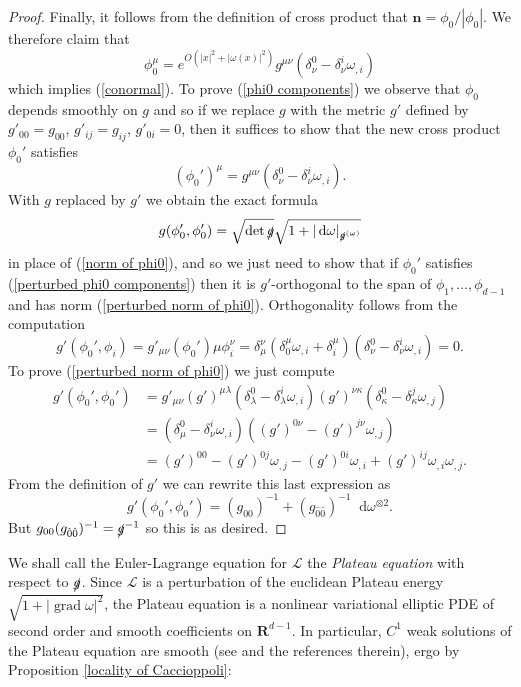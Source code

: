 \documentclass[reqno,12pt,letterpaper]{amsart}
\newcommand{\RR}{\mathbf{R}}
\newcommand*\dif{\mathop{}\!\mathrm{d}}
\DeclareMathOperator{\grad}{grad}
\newcommand{\Lagrange}{\mathscr L}
\newcommand{\normal}{\mathbf n}
\newcommand{\dfn}[1]{\emph{#1}\index{#1}}
\theoremstyle{definition}
\numberwithin{equation}{section}
\begin{document}
\begin{proof}
Finally, it follows from the definition of cross product that $\normal = \phi_0/|\phi_0|$.
We therefore claim that
\begin{equation}\label{phi0 components}
\phi_0^\mu = e^{O(|x|^2 + |\omega(x)|^2)} g^{\mu\nu}(\delta_\nu^0 - \delta_\nu^i\omega_{,i})
\end{equation}
which implies (\ref{conormal}). To prove (\ref{phi0 components}) we observe that $\phi_0$ depends smoothly on $g$ and so if we replace $g$ with the metric $g'$ defined by $g'_{00} = g_{00}$, $g'_{ij} = g_{ij}$, $g'_{0i} = 0$, then it suffices to show that the new cross product $\phi_0'$ satisfies
\begin{equation}\label{perturbed phi0 components}
(\phi_0')^\mu = g^{\mu\nu}(\delta_\nu^0 - \delta_\nu^i\omega_{,i}).
\end{equation}
With $g$ replaced by $g'$ we obtain the exact formula
\begin{equation}\label{perturbed norm of phi0}
g(\phi_0', \phi_0') = \sqrt{\det \slashed g} \sqrt{1 + |\dif \omega|_{\slashed g^{(\omega)}}}
\end{equation}
in place of (\ref{norm of phi0}), and so we just need to show that if $\phi_0'$ satisfies (\ref{perturbed phi0 components}) then it is $g'$-orthogonal to the span of $\phi_1, \dots, \phi_{d - 1}$ and has norm (\ref{perturbed norm of phi0}).
Orthogonality follows from the computation
$$g'(\phi_0', \phi_i) = g'_{\mu\nu} (\phi_0')\mu \phi_i^\nu = \delta_\mu^\nu (\delta_0^\mu \omega_{,i} + \delta_i^\mu) (\delta_\nu^0 - \delta_\nu^i \omega_{,i}) = 0.$$
To prove (\ref{perturbed norm of phi0}) we just compute
\begin{align*}
g'(\phi_0', \phi_0')
&= g'_{\mu \nu} (g')^{\mu \lambda}(\delta^0_\lambda - \delta^i_\lambda \omega_{,i}) (g')^{\nu \kappa}(\delta_\kappa^0 - \delta_\kappa^j \omega_{,j})\\
&= (\delta_\mu^0 - \delta_\nu^i \omega_{,i})((g')^{0 \nu} - (g')^{j \nu} \omega_{,j})\\
&= (g')^{00} - (g')^{0j} \omega_{,j} - (g')^{0i} \omega_{,i} + (g')^{ij} \omega_{,i} \omega_{,j}.
\end{align*}
From the definition of $g'$ we can rewrite this last expression as
$$g'(\phi_0', \phi_0') = (g_{00})^{-1} + (g_{\hat 0 \hat 0})^{-1} \dif \omega^{\otimes 2}.$$
But $g_{00} (g_{\hat 0 \hat 0})^{-1} = \slashed g^{-1}$ so this is as desired.
\end{proof}

We shall call the Euler-Lagrange equation for $\Lagrange$ the \dfn{Plateau equation} with respect to $\slashed g$.
Since $\Lagrange$ is a perturbation of the euclidean Plateau energy $\sqrt{1 + |\grad \omega|^2}$, the Plateau equation is a nonlinear variational elliptic PDE of second order and smooth coefficients on $\RR^{d - 1}$.
In particular, $C^1$ weak solutions of the Plateau equation are smooth (see \cite[\S8.3.2]{evans2010partial} and the references therein), ergo by Proposition \ref{locality of Caccioppoli}:
\end{document}
